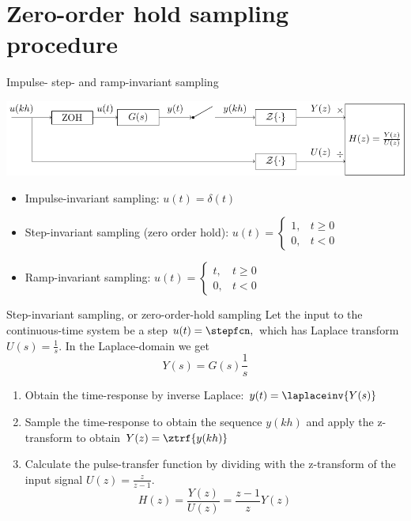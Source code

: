 \documentclass[presentation,aspectratio=169]{beamer}
\begin{document}
\section{Zero-order hold sampling procedure}
\label{sec-4}
\begin{frame}[label=sec-4-1]{Impulse- step- and ramp-invariant sampling}
\begin{center}
\includegraphics[width=0.9\linewidth]{../../figures/invariant-sampling.pdf}
\end{center}

\begin{itemize}
\item Impulse-invariant sampling: \( u(t) = \delta(t)\)
\item Step-invariant sampling (zero order hold): \( u(t) = \begin{cases} 1, & t \ge 0\\0, & t<0 \end{cases} \)
\item Ramp-invariant sampling: \( u(t) = \begin{cases} t, & t \ge 0\\0, & t<0 \end{cases} \)
\end{itemize}
\end{frame}

\begin{frame}[label=sec-4-2]{Step-invariant sampling, or zero-order-hold sampling}
Let the input to the continuous-time system be a step \(u(t)=\stepfcn,\) which has Laplace transform \(U(s)=\frac{1}{s}.\) In the Laplace-domain we get
\[Y(s) = G(s)\frac{1}{s}\]
\begin{enumerate}
\item Obtain the time-response by inverse Laplace: \(y(t)=\laplaceinv{Y(s)}\)
\item Sample the time-response to obtain the sequence \(y(kh)\) and apply  the z-transform to obtain \(Y(z) = \ztrf{y(kh)}\)
\item Calculate the pulse-transfer function by dividing with the z-transform of the input signal \(U(z) = \frac{z}{z-1}. \) \[H(z) = \frac{Y(z)}{U(z)} = \frac{z-1}{z}Y(z) \]
\end{enumerate}
\end{frame}
\end{document}
